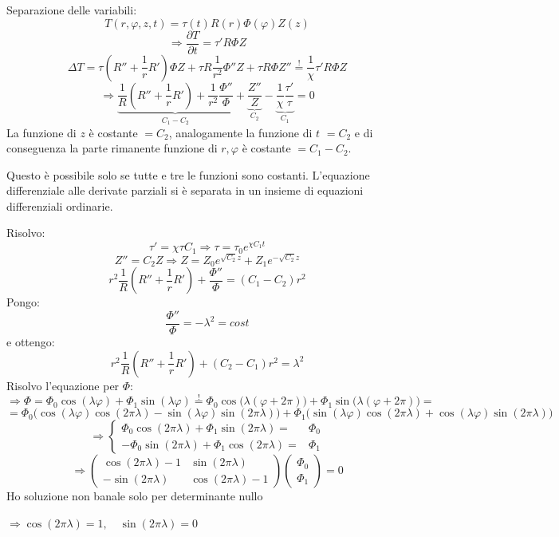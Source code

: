 \documentclass[a4paper,11pt]{report}
\begin{document}
Separazione delle variabili:
\[
T(r,\varphi,z,t)=\tau(t)R(r)\Phi(\varphi)Z(z)
\]
\[
\Rightarrow \frac{\partial T}{\partial t}=\tau'R\Phi Z
\]
\[
\Delta T=\tau(R'' +\frac{1}{r}R')\Phi Z + \tau R \frac{1}{r^2}\Phi''Z+\tau R \Phi Z'' \overset{!}{=} \frac{1}{\chi}\tau'R\Phi Z 
\]
\[
\Rightarrow \underbrace{ \frac{1}{R}(R'' + \frac{1}{r}R') + \frac{1}{r^2} \frac{\Phi''}{\Phi}}_{C_1-C_2}+\underbrace{\frac{Z''}{Z}}_{C_2}-\underbrace{\frac{1}{\chi}\frac{\tau'}{\tau}}_{C_1}=0
\]
La funzione di $z$ \`e costante $=C_2$, analogamente la funzione di $t$ $=C_2$ e di conseguenza la parte rimanente funzione di $r,\varphi$ \`e costante $=C_1-C_2$.

Questo \`e possibile solo se tutte e tre le funzioni sono costanti. L'equazione differenziale alle derivate parziali si \`e separata in un insieme di equazioni differenziali ordinarie.

Risolvo:
\[
\tau'=\chi\tau C_1 \Rightarrow \tau=\tau_0 e^{\chi C_1 t} 
\]
\[
Z''=C_2Z \Rightarrow Z=Z_0e^{\sqrt{C_2}z}+Z_1e^{-\sqrt{C_2}z}
\]
\[
r^2\frac{1}{R}(R''+\frac{1}{r}R')+\frac{\Phi''}{\Phi}=(C_1-C_2)r^2 
\]
Pongo:
\[
\frac{\Phi''}{\Phi}=-\lambda^2=cost
\]
e ottengo:
\[
r^2\frac{1}{R}(R''+\frac{1}{r}R')+ (C_2-C_1)r^2=\lambda^2
\]
Risolvo l'equazione per $\Phi$:
\[
\Rightarrow \Phi=\Phi_0 \cos{(\lambda\varphi)} + \Phi_1\sin{(\lambda\varphi)}\overset{!}{=}
\Phi_0\cos{\big(\lambda(\varphi+2\pi)\big)}+\Phi_1\sin{\big(\lambda(\varphi+2\pi)\big)}=
\]
\[
=\Phi_0\big( \cos{(\lambda\varphi)} \cos{( 2\pi\lambda)} - \sin{(\lambda\varphi)} \sin{( 2\pi\lambda)} \big)+
\Phi_1\big( \sin{(\lambda\varphi)} \cos{( 2\pi\lambda)} + \cos{(\lambda\varphi)} \sin{( 2\pi\lambda)} \big)
\]
\[
\Rightarrow \left\{\begin{aligned}
\Phi_0\cos{(2\pi\lambda)} + \Phi_1 \sin{(2\pi\lambda)}=&\Phi_0\\
-\Phi_0\sin{(2\pi\lambda)} + \Phi_1 \cos{(2\pi\lambda)}=&\Phi_1
\end{aligned}\right.
\]
\[
\Rightarrow
\left(\begin{matrix}
\cos( 2\pi\lambda) -1 & \sin( 2\pi\lambda) \\
-\sin( 2\pi\lambda) & \cos( 2\pi\lambda) -1
\end{matrix}\right)
\left(\begin{matrix}
\Phi_0\\
\Phi_1
\end{matrix}\right)
=0
\]
Ho soluzione non banale solo per determinante nullo

$\Rightarrow \cos (2\pi\lambda)=1, \quad \sin (2\pi\lambda)=0$  
\end{document}
